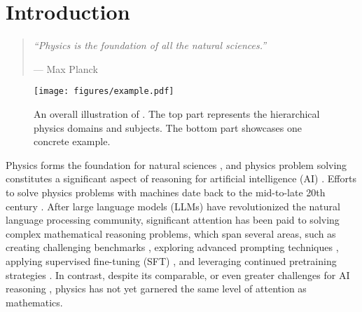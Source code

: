 \section{Introduction}\label{sec: intro}

\begin{quote}
    \textit{``Physics is the foundation of all the natural sciences.''} \\
    \vspace{-3em} %
    \begin{flushright}
        --- Max Planck
    \end{flushright}
\end{quote}
\vspace{-1em}

\begin{figure}[t]
    \centering
    \texttt{[image: figures/example.pdf]}
    \caption{An overall illustration of {\benchmark}. The top part represents the hierarchical physics domains and subjects. The bottom part showcases one concrete example.
    }
    \label{fig:example}
\end{figure}
Physics forms the foundation for natural sciences \citep{planck1949autobiography, hawking1988time, giancoli2000physics}, and physics problem solving constitutes a significant aspect of reasoning for artificial intelligence (AI) \citep{phyre2019bakhtin, PhysQA2023Ding, physicsreasoner2024pang, MoRA2024jaiswal}.
Efforts to solve physics problems with machines date back to the mid-to-late 20th century \citep{larkin1980expert, mendelson1984physics, klahr1986ai}.
After large language models (LLMs) have revolutionized the natural language processing community, significant attention has been paid to solving complex mathematical reasoning problems, which span several areas, such as creating challenging benchmarks \citep{CollegeMath2024Tang, omnimath2024gao, ugmathbench2025xu}, exploring advanced prompting techniques \citep{CoT2022Wei, CoT-SC2022Wang}, applying supervised fine-tuning (SFT) \citep{dartmath2024tong, E-GSM2024Xu}, and leveraging continued pretraining strategies \citep{minerva202lewkowycz, llemma2023azerbayev}.
In contrast, despite its comparable, or even greater challenges for AI reasoning \citep{OlympiadBench2024He, physicsreasoner2024pang}, physics has not yet garnered the same level of attention as mathematics.




